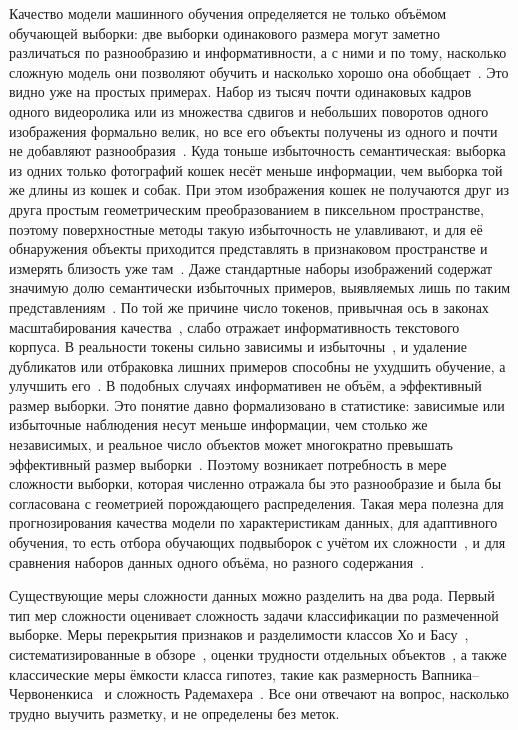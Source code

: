 \documentclass[14pt, a4paper]{extarticle}
\theoremstyle{definition}
\theoremstyle{plain}
\begin{document}
Качество модели машинного обучения определяется не только объёмом обучающей
выборки: две выборки одинакового размера могут заметно различаться по
разнообразию и информативности, а с ними и по тому, насколько сложную модель они
позволяют обучить и насколько хорошо она обобщает~\cite{Mei2022Towards,Konz2024Effect}.
Это видно уже на простых примерах. Набор из тысяч почти одинаковых кадров одного
видеоролика или из множества сдвигов и небольших поворотов одного изображения
формально велик, но все его объекты получены из одного и
почти не добавляют разнообразия~\cite{Chen2020GroupAugmentation}. Куда тоньше избыточность семантическая: выборка из одних только
фотографий кошек несёт меньше информации, чем выборка той же длины из кошек и
собак. При этом изображения кошек не получаются друг из друга простым
геометрическим преобразованием в пиксельном пространстве, поэтому поверхностные
методы такую избыточность не улавливают, и для её обнаружения объекты приходится
представлять в признаковом пространстве и измерять близость уже
там~\cite{Abbas2023SemDeDup}.
Даже стандартные наборы изображений содержат значимую долю семантически
избыточных примеров, выявляемых лишь по таким
представлениям~\cite{Birodkar2019Semantic}. По той же
причине число токенов, привычная ось в законах масштабирования
качества~\cite{Kaplan2020ScalingLaws}, слабо отражает информативность текстового
корпуса. В реальности токены сильно зависимы и избыточны~\cite{Chen2025SubScaling}, и удаление
дубликатов или отбраковка лишних примеров способны не ухудшить обучение, а
улучшить его~\cite{Lee2022Deduplicating,Sorscher2022BeyondScaling}. В подобных
случаях информативен не объём, а эффективный размер выборки. Это понятие давно
формализовано в статистике: зависимые или избыточные наблюдения несут меньше
информации, чем столько же независимых, и реальное число объектов может
многократно превышать эффективный размер выборки~\cite{Geyer1992MCMC}. Поэтому
возникает потребность в мере
сложности выборки, которая численно отражала бы это разнообразие и была бы
согласована с геометрией порождающего распределения. Такая мера полезна для
прогнозирования качества модели по характеристикам данных, для адаптивного
обучения, то есть отбора обучающих подвыборок с учётом их
сложности~\cite{Bengio2009Curriculum,Kumar2010SelfPaced}, и для сравнения наборов
данных одного объёма, но разного содержания~\cite{Swayamdipta2020Cartography,Rahane2020Measures}.

Существующие меры сложности данных можно разделить на два рода. Первый тип мер сложности оценивает
сложность задачи классификации по размеченной выборке. Меры перекрытия признаков
и разделимости классов Хо и Басу~\cite{Ho2002Complexity}, систематизированные в
обзоре~\cite{Lorena2019Complexity}, оценки трудности отдельных
объектов~\cite{Smith2014Instance}, а также классические меры ёмкости класса
гипотез, такие как размерность Вапника--Червоненкиса~\cite{VapnikChervonenkis1974} и сложность
Радемахера~\cite{KoltchinskiiPanchenko2000Rademacher}. Все они отвечают на вопрос,
насколько трудно выучить разметку, и не определены без меток.
\end{document}
